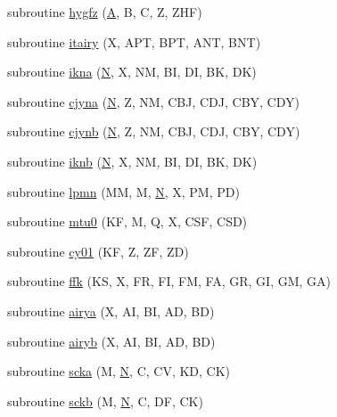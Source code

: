 \begin{DoxyCompactItemize}
subroutine \hyperlink{specfun_8f_aa7bf241cb638d42e26e357e8ec3d3612}{hygfz} (\hyperlink{classA}{A}, B, C, Z, Z\+H\+F)
\item 
subroutine \hyperlink{specfun_8f_a4eb7c83fb858aea6a9d2ed1f1676949b}{itairy} (X, A\+P\+T, B\+P\+T, A\+N\+T, B\+N\+T)
\item 
subroutine \hyperlink{specfun_8f_a023995f0e4a10653145123c1541dfe21}{ikna} (\hyperlink{polmisc_8c_a0240ac851181b84ac374872dc5434ee4}{N}, X, N\+M, B\+I, D\+I, B\+K, D\+K)
\item 
subroutine \hyperlink{specfun_8f_ad2539a6a5fdf9e06574c70ae730ad099}{cjyna} (\hyperlink{polmisc_8c_a0240ac851181b84ac374872dc5434ee4}{N}, Z, N\+M, C\+B\+J, C\+D\+J, C\+B\+Y, C\+D\+Y)
\item 
subroutine \hyperlink{specfun_8f_a5dac8a3ad046f6542d98e5d0bc713a82}{cjynb} (\hyperlink{polmisc_8c_a0240ac851181b84ac374872dc5434ee4}{N}, Z, N\+M, C\+B\+J, C\+D\+J, C\+B\+Y, C\+D\+Y)
\item 
subroutine \hyperlink{specfun_8f_ae4af23bbe2744ccf1883fd4d9bc924d7}{iknb} (\hyperlink{polmisc_8c_a0240ac851181b84ac374872dc5434ee4}{N}, X, N\+M, B\+I, D\+I, B\+K, D\+K)
\item 
subroutine \hyperlink{specfun_8f_a0810e7db75472217930340087d117c40}{lpmn} (M\+M, M, \hyperlink{polmisc_8c_a0240ac851181b84ac374872dc5434ee4}{N}, X, P\+M, P\+D)
\item 
subroutine \hyperlink{specfun_8f_a6a387849889868f970723340eb781f42}{mtu0} (K\+F, M, Q, X, C\+S\+F, C\+S\+D)
\item 
subroutine \hyperlink{specfun_8f_a5d54c94b9fb91daaf1c19f90afdb4603}{cy01} (K\+F, Z, Z\+F, Z\+D)
\item 
subroutine \hyperlink{specfun_8f_a6ac54ecd6e230a969e5a6ad2962c9177}{ffk} (K\+S, X, F\+R, F\+I, F\+M, F\+A, G\+R, G\+I, G\+M, G\+A)
\item 
subroutine \hyperlink{specfun_8f_adec9575d1be95f14076f94b61e7adee6}{airya} (X, A\+I, B\+I, A\+D, B\+D)
\item 
subroutine \hyperlink{specfun_8f_ac6e7985f1dc03f4d60ed30cf9ff07174}{airyb} (X, A\+I, B\+I, A\+D, B\+D)
\item 
subroutine \hyperlink{specfun_8f_a0519aebbd534351075e5cfac00d047ff}{scka} (M, \hyperlink{polmisc_8c_a0240ac851181b84ac374872dc5434ee4}{N}, C, C\+V, K\+D, C\+K)
\item 
subroutine \hyperlink{specfun_8f_a5ace8450cea6bced7e4a550a9c46f704}{sckb} (M, \hyperlink{polmisc_8c_a0240ac851181b84ac374872dc5434ee4}{N}, C, D\+F, C\+K)
\item 

\end{DoxyCompactItemize}
